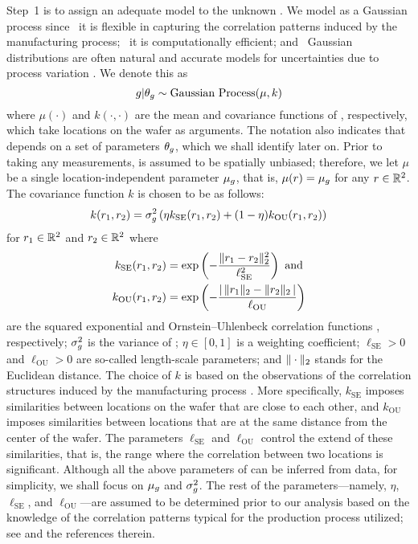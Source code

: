 Step~1 is to assign an adequate model to the unknown \g. We model \g as a
Gaussian process \cite{rasmussen2006} since \one~it is flexible in capturing the
correlation patterns induced by the manufacturing process; \two~it is
computationally efficient; and \three~Gaussian distributions are often natural
and accurate models for uncertainties due to process variation
\cite{srivastava2010, reda2009, juan2012}. We denote this as
\begin{equation} \elab{inference-prior}
  \g | \t_\g \sim \text{Gaussian Process}(\mu, k)
\end{equation}
where $\mu(\cdot)$ and $k(\cdot, \cdot)$ are the mean and covariance functions
of \g, respectively, which take locations on the wafer as arguments. The
notation also indicates that \g depends on a set of parameters $\t_\g$, which we
shall identify later on. Prior to taking any measurements, \g is assumed to be
spatially unbiased; therefore, we let $\mu$ be a single location-independent
parameter $\mu_\g$, that is, $\mu(r) = \mu_\g$ for any $r \in \real^2$. The
covariance function $k$ is chosen to be as follows:
\begin{equation} \elab{inference-covariance}
  k(r_1, r_2) = \sigma_\g^2 \left(\eta k_\text{SE}(r_1, r_2) + (1 - \eta) k_\text{OU}(r_1, r_2)\right)
\end{equation}
for $r_1 \in \real^2$ and $r_2 \in \real^2$ where
\begin{align*}
  k_\text{SE}(r_1, r_2) & = \exp\left(-\frac{\norm[2]{r_1 - r_2}^2}{\ell_\text{SE}^2}\right) \text{ and} \\
  k_\text{OU}(r_1, r_2) & = \exp\left(-\frac{\absolute{\,\norm[2]{r_1} - \norm[2]{r_2}\,}}{\ell_\text{OU}}\right)
\end{align*}
are the squared exponential and Ornstein--Uhlenbeck correlation functions
\cite{rasmussen2006}, respectively; $\sigma_\g^2$ is the variance of \g; $\eta
\in [0, 1]$ is a weighting coefficient; $\ell_\text{SE} > 0$ and $\ell_\text{OU}
> 0$ are so-called length-scale parameters; and $\norm[2]{\cdot}$ stands for the
Euclidean distance. The choice of $k$ is based on the observations of the
correlation structures induced by the manufacturing process
\cite{chandrakasan2000, cheng2011}. More specifically, $k_\text{SE}$ imposes
similarities between locations on the wafer that are close to each other, and
$k_\text{OU}$ imposes similarities between locations that are at the same
distance from the center of the wafer. The parameters $\ell_\text{SE}$ and
$\ell_\text{OU}$ control the extend of these similarities, that is, the range
where the correlation between two locations is significant. Although all the
above parameters of \g can be inferred from data, for simplicity, we shall focus
on $\mu_\g$ and $\sigma_\g^2$. The rest of the parameters---namely, $\eta$,
$\ell_\text{SE}$, and $\ell_\text{OU}$---are assumed to be determined prior to
our analysis based on the knowledge of the correlation patterns typical for the
production process utilized; see \cite{marzouk2009} and the references therein.

